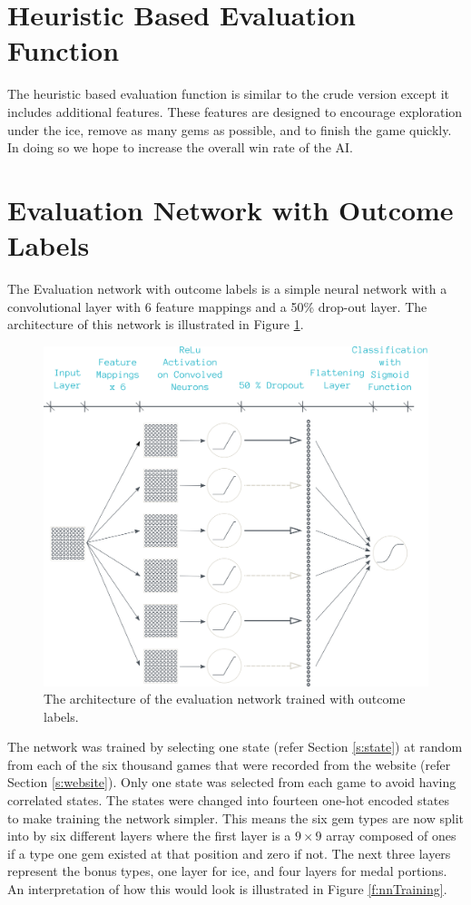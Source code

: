 \documentclass{bhamthesis}
\theoremstyle{definition}
\begin{document}
\section{Heuristic Based Evaluation Function}
The heuristic based evaluation function is similar to the crude version except it includes additional features. These features are designed to encourage exploration under the ice, remove as many gems as possible, and to finish the game quickly. In doing so we hope to increase the overall win rate of the AI.
\section{Evaluation Network with Outcome Labels}
The Evaluation network with outcome labels is a simple neural network with a convolutional layer with 6 feature mappings and a 50\% drop-out layer. The architecture of this network is illustrated in Figure \ref{f:nnArch}.

\begin{figure}
	\includegraphics[width=\textwidth]{media/img/nnArch}
	\caption{The architecture of the evaluation network trained with outcome labels.}\label{f:nnArch}
\end{figure}
 The network was trained by selecting one state (refer Section \ref{s:state}) at random from each of the six thousand games that were recorded from the website (refer Section \ref{s:website}). Only one state was selected from each game to avoid having correlated states. The states were changed into fourteen one-hot encoded states to make training the network simpler. This means the six gem types are now split into by six different layers where the first layer is a $9 \times 9$ array composed of ones if a type one gem existed at that position and zero if not. The next three layers represent the bonus types, one layer for ice, and four layers for medal portions. An interpretation of how this would look is illustrated in Figure \ref{f:nnTraining}.
 
\end{document}
